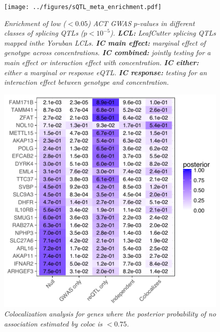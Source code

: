 \documentclass{article}
\begin{document}
\begin{figure}[h]
\begin{center}
    \texttt{[image: ../figures/sQTL\_meta\_enrichment.pdf]} 
    \caption{\it{Enrichment of low ($<0.05$) ACT GWAS $p$-values in different classes of splicing QTLs ($p < 10^{-5}$). \textbf{LCL:} LeafCutter splicing QTLs mapped inthe Yoruban LCLs\cite{li2016rna}. \textbf{IC main effect:} marginal effect of genotype across concentrations. \textbf{IC combined:} jointly testing for a main effect or interaction effect with concentration. \textbf{IC either:} either a marginal or response eQTL. \textbf{IC response:} testing for an interaction effect between genotype and concentration.}}
    \label{fig:sQTL_meta_enrichment}
    \end{center}
\end{figure}

\begin{figure}[h]
\begin{center}
    \includegraphics[width=.7\textwidth]{../figures/coloc.pdf} 
    \caption{\it{Colocalization analysis for genes where the posterior probability of no association estimated by \emph{coloc} is $<0.75$.}}
    \label{fig:coloc}
    \end{center}
\end{figure}
\end{document}
